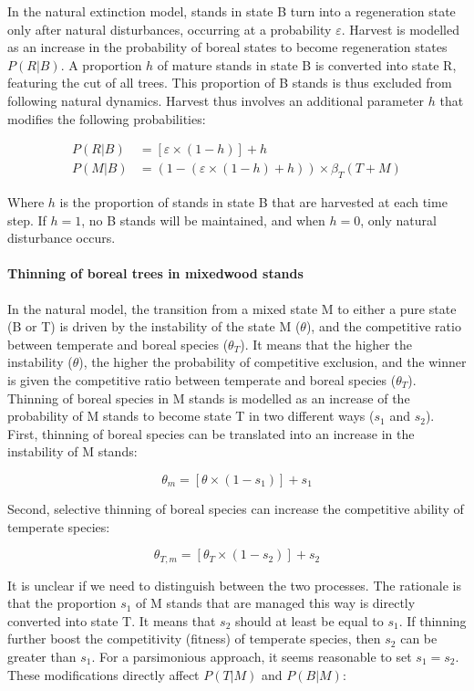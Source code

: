 \documentclass[12pt]{article}
\begin{document}
In the natural extinction model, stands in state B turn into a
regeneration state only after natural disturbances, occurring at a
probability \(\varepsilon\). Harvest is modelled as an increase in the
probability of boreal states to become regeneration states \(P(R|B)\). A
proportion \(h\) of mature stands in state B is converted into state R,
featuring the cut of all trees. This proportion of B stands is thus
excluded from following natural dynamics. Harvest thus involves an
additional parameter \(h\) that modifies the following probabilities:

\[
\begin{aligned}
  P(R|B) &= [\varepsilon \times (1 - h)] + h \\
  P(M|B) &= (1- (\varepsilon \times (1 - h) + h)) \times \beta_T(T + M)
\end{aligned}
\]

Where \(h\) is the proportion of stands in state B that are harvested at
each time step. If \(h=1\), no B stands will be maintained, and when
\(h=0\), only natural disturbance occurs.

\hypertarget{thinning-of-boreal-trees-in-mixedwood-stands}{%
\paragraph{Thinning of boreal trees in mixedwood
stands}\label{thinning-of-boreal-trees-in-mixedwood-stands}}

In the natural model, the transition from a mixed state M to either a
pure state (B or T) is driven by the instability of the state M
(\(\theta\)), and the competitive ratio between temperate and boreal
species (\(\theta_T\)). It means that the higher the instability
(\(\theta\)), the higher the probability of competitive exclusion, and
the winner is given the competitive ratio between temperate and boreal
species (\(\theta_T\)). Thinning of boreal species in M stands is
modelled as an increase of the probability of M stands to become state T
in two different ways (\(s_1\) and \(s_2\)). First, thinning of boreal
species can be translated into an increase in the instability of M
stands:

\[
  \theta_{m} = [\theta \times (1 - s_1)] + s_1
\]

Second, selective thinning of boreal species can increase the
competitive ability of temperate species:

\[
\theta_{T, m} = [\theta_{T} \times (1 - s_2)] + s_2
\]

It is unclear if we need to distinguish between the two processes. The
rationale is that the proportion \(s_1\) of M stands that are managed
this way is directly converted into state T. It means that \(s_2\)
should at least be equal to \(s_1\). If thinning further boost the
competitivity (fitness) of temperate species, then \(s_2\) can be
greater than \(s_1\). For a parsimonious approach, it seems reasonable
to set \(s_1=s_2\). These modifications directly affect \(P(T|M)\) and
\(P(B|M)\):
\end{document}
